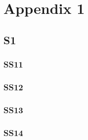 \chapter{Appendix 1}\label{ch:A1}
\lipsum[1-4]
\section{S1}
\lipsum[1-4]
\subsection{SS11}
\lipsum[1-4]
\FloatBarrier
\subsection{SS12}
\lipsum[1-4]
\FloatBarrier
\subsection{SS13}
\lipsum[1-4]
\FloatBarrier
\subsection{SS14}
\lipsum[1-4]
\FloatBarrier




